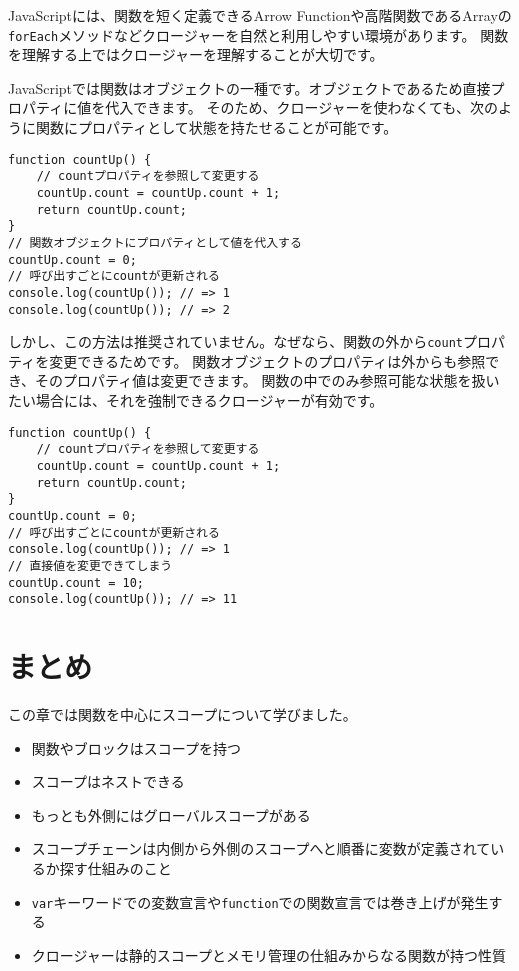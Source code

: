 JavaScriptには、関数を短く定義できるArrow
Functionや高階関数であるArrayの\texttt{forEach}メソッドなどクロージャーを自然と利用しやすい環境があります。
関数を理解する上ではクロージャーを理解することが大切です。

\begin{tcolorbox}[enhanced jigsaw,breakable,title=状態を持つ関数オブジェクト]\label{closure-vs-function-object}

JavaScriptでは関数はオブジェクトの一種です。オブジェクトであるため直接プロパティに値を代入できます。
そのため、クロージャーを使わなくても、次のように関数にプロパティとして状態を持たせることが可能です。

\begin{lstlisting}
function countUp() {
    // countプロパティを参照して変更する
    countUp.count = countUp.count + 1;
    return countUp.count;
}
// 関数オブジェクトにプロパティとして値を代入する
countUp.count = 0;
// 呼び出すごとにcountが更新される
console.log(countUp()); // => 1
console.log(countUp()); // => 2
\end{lstlisting}

しかし、この方法は推奨されていません。なぜなら、関数の外から\texttt{count}プロパティを変更できるためです。
関数オブジェクトのプロパティは外からも参照でき、そのプロパティ値は変更できます。
関数の中でのみ参照可能な状態を扱いたい場合には、それを強制できるクロージャーが有効です。

\begin{lstlisting}
function countUp() {
    // countプロパティを参照して変更する
    countUp.count = countUp.count + 1;
    return countUp.count;
}
countUp.count = 0;
// 呼び出すごとにcountが更新される
console.log(countUp()); // => 1
// 直接値を変更できてしまう
countUp.count = 10;
console.log(countUp()); // => 11
\end{lstlisting}
\end{tcolorbox}

\hypertarget{conclusion}{%
\section{まとめ}\label{conclusion}}

この章では関数を中心にスコープについて学びました。

\begin{itemize}
\item
  関数やブロックはスコープを持つ
\item
  スコープはネストできる
\item
  もっとも外側にはグローバルスコープがある
\item
  スコープチェーンは内側から外側のスコープへと順番に変数が定義されているか探す仕組みのこと
\item
  \texttt{var}キーワードでの変数宣言や\texttt{function}での関数宣言では巻き上げが発生する
\item
  クロージャーは静的スコープとメモリ管理の仕組みからなる関数が持つ性質
\end{itemize}
